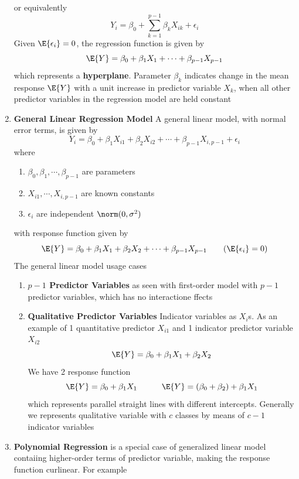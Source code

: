 \documentclass[11pt]{article}
\begin{document}
\begin{enumerate}
    or equivalently
    \[
        Y_i = \beta_0 + \sum_{k=1}^{p-1} \beta_k X_{ik} + \epsilon_i
    \]
    Given $\E\{ \epsilon_i \} = 0$, the regression function is given by
    \[
        \E\{Y\} = \beta_0 + \beta_1 X_1 + \cdots + \beta_{p-1}X_{p-1}
    \]
    which represents a \textbf{hyperplane}. Parameter $\beta_k$ indicates change in the mean response $\E\{Y\}$ with a unit increase in predictor variable $X_k$, when all other predictor variables in the regression model are held constant
    \item \textbf{General Linear Regression Model} A general linear model, with normal error terms, is given by 
    \[
        Y_i = \beta_0 + \beta_1 X_{i1} + \beta_2 X_{i2} + \cdots + \beta_{p-1}X_{i, p-1} + \epsilon_i 
    \]
    where 
    \begin{enumerate}
        \item $\beta_0, \beta_1, \cdots, \beta_{p-1}$ are parameters 
        \item $X_{i1}, \cdots, X_{i, p-1}$ are known constants 
        \item $\epsilon_i$ are independent $\norm(0, \sigma^2)$
    \end{enumerate}
    with response function given by 
    \[
        \E\{Y\} = \beta_0 + \beta_1 X_1 + \beta_2 X_2 + \cdots + \beta_{p-1}X_{p-1} \tag{$\E\{\epsilon_i\}=0$}
    \]
    The general linear model usage cases
    \begin{enumerate}
        \item \textbf{$p-1$ Predictor Variables} as seen with first-order model with $p-1$ predictor variables, which has no interactione ffects
        \item \textbf{Qualitative Predictor Variables} Indicator variables as $X_i$s. As an example of 1 quantitative predictor $X_{i1}$ and 1 indicator predictor variable $X_{i2}$
        \[
            \E\{Y\} = \beta_0 + \beta_1 X_1 + \beta_2 X_2 
        \]
        We have 2 response function 
        \[
            \E\{Y\} = \beta_0 + \beta_1 X_1 
            \quad \quad \quad 
            \E\{Y\} = (\beta_0 + \beta_2) + \beta_1 X_1
        \]
        which represents parallel straight lines with different intercepts. Generally we represents qualitative variable with $c$ classes by means of $c-1$ indicator variables 
    \end{enumerate}
    \item \textbf{Polynomial Regression} is a special case of generalized linear model contaiing higher-order terms of predictor variable, making the response function curlinear. For example 

\end{enumerate}
\end{document}
